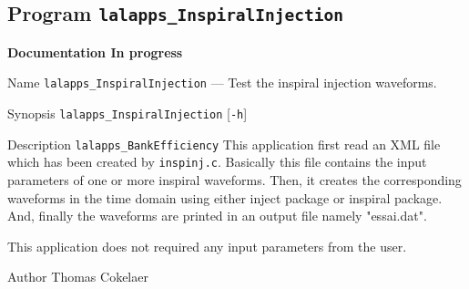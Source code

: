 \subsection{Program \texttt{lalapps\_InspiralInjection}}
\label{program:lalapps-BankEfficiency}
{\LARGE{{\bf Documentation In progress}}}

\begin{entry}

\item[Name]
\verb$lalapps_InspiralInjection$ --- Test the inspiral injection waveforms.

\item[Synopsis]
\verb$lalapps_InspiralInjection$ [\verb$-h$] 

\item[Description]
\verb$lalapps_BankEfficiency$ This application first read an XML file which has been created
by \texttt{inspinj.c}. Basically this file contains the input parameters of one or more
 inspiral waveforms. Then, it creates the corresponding waveforms in the time domain using 
either inject package or inspiral package. And, finally the waveforms are printed in an output
 file namely "essai.dat". 

This application does not required any input parameters from the user. 




\item[Author]
Thomas Cokelaer

\end{entry}
